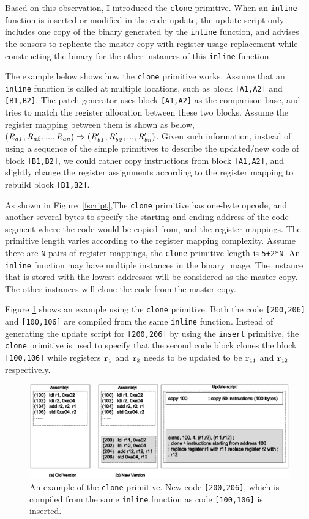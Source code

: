 Based on this observation, I introduced the {\tt clone} primitive. 
When an {\tt inline} function is inserted or modified in the code update, the update script only includes one copy of the binary generated by the {\tt inline} function, and advises the sensors to 
replicate the master copy with register usage replacement while constructing the binary for the other instances of this {\tt inline} function.

The example below shows how the {\tt clone} primitive works.
Assume that an {\tt inline}
function is called at multiple locations, such as block {\tt [A1,A2]} and {\tt [B1,B2]}. 
The patch generator uses block {\tt [A1,A2]} as the comparison base, 
and tries to match the register allocation between these two blocks. 
Assume the register mapping between them is shown as below, 
$(\it{R_{a1},R_{a2},...,R_{an})\Rightarrow(R_{b1}^\prime,R_{b2}^\prime,...,R_{bn}^\prime)}$.
Given such information, instead of using a sequence of the simple primitives to describe the
updated/new code of block {\tt [B1,B2]}, we could rather copy instructions from block 
{\tt [A1,A2]}, and slightly change the register
assignments according to the register mapping 
to rebuild block {\tt [B1,B2]}.


As shown in Figure~\ref{fscript},The {\tt clone} primitive has one-byte opcode, and another
several bytes to specify the starting and ending address 
of the code segment where the code would be copied from, and the register mappings.
The primitive length varies according to the register mapping complexity.
Assume there are {\tt N} pairs of register mappings, the {\tt clone} primitive length is
{\tt 5+2*N}. An {\tt inline} function may have multiple instances in the binary image. The 
instance that is stored with the lowest addresses will be considered as the master copy.
The other instances will clone the code from the master copy.


Figure \ref{fclone} shows an example using the {\tt clone} primitive.  Both the code {\tt [200,206]} and {\tt [100,106]} are compiled from the same {\tt inline} function. Instead of generating the update script for {\tt [200,206]} by using the {\tt insert} primitive, the {\tt clone} primitive is used to specify that the second code block clones the block {\tt [100,106]} while registers  
${\tt r_1}$ and ${\tt r_2}$ needs to be updated to be ${\tt r_{11}}$ and ${\tt r_{12}}$ respectively.
\begin{figure}[htbp]
\centering
\includegraphics[width=6in]{figures/sclone.eps}
\caption[An example of the {\tt clone} primitive.]{An example of the {\tt clone} primitive. New code {\tt [200,206]}, which
is compiled from the same {\tt inline} function as code {\tt [100,106]} is inserted.}
\label{fclone}
\end{figure}

